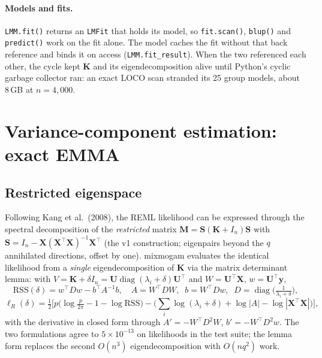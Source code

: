 \documentclass[11pt]{article}
\newcommand{\y}{\mathbf{y}}
\newcommand{\K}{\mathbf{K}}
\newcommand{\Mm}{\mathbf{M}}
\newcommand{\X}{\mathbf{X}}
\newcommand{\U}{\mathbf{U}}
\newcommand{\Sm}{\mathbf{S}}
\begin{document}
\paragraph{Models and fits.} \texttt{LMM.fit()} returns an
\texttt{LMFit} that holds its model, so \texttt{fit.scan()},
\texttt{blup()} and \texttt{predict()} work on the fit alone. The model
caches the fit without that back reference and binds it on access
(\texttt{LMM.fit\_result}). When the two referenced each other, the cycle
kept $\K$ and its eigendecomposition alive until Python's cyclic garbage
collector ran: an exact LOCO scan stranded its 25 group models, about
8\,GB at $n = 4{,}000$.

\section{Variance-component estimation: exact EMMA}
\label{sec:fit}

\subsection{Restricted eigenspace}

Following Kang et al.\ (2008), the REML likelihood can be expressed
through the spectral decomposition of the \emph{restricted} matrix
$\Mm = \Sm(\K + I_n)\Sm$ with $\Sm = I_n - \X(\X^\top\X)^{-1}\X^\top$
(the v1 construction; eigenpairs beyond the $q$ annihilated directions,
offset by one). mixmogam evaluates the identical likelihood from a
\emph{single} eigendecomposition of $\K$ via the matrix determinant
lemma: with $V = \K + \delta I_n = \U \operatorname{diag}(\lambda_i +
\delta) \U^\top$ and $W = \U^\top \X$, $w = \U^\top \y$,
\begin{equation}
  \mathrm{RSS}(\delta) = w^\top D w - b^\top A^{-1} b, \quad
  A = W^\top D W,\;\; b = W^\top D w,\;\; D = \operatorname{diag}\bigl(\tfrac{1}{\lambda_i + \delta}\bigr),
\end{equation}
\begin{equation}
  \ell_R(\delta) = \tfrac12\Big[p\big(\log\tfrac{p}{2\pi} - 1 - \log \mathrm{RSS}\big)
  - \big(\textstyle\sum_i \log(\lambda_i{+}\delta) + \log|A| - \log|\X^\top\X|\big)\Big],
  \label{eq:reml}
\end{equation}
with the derivative in closed form through $A' = -W^\top D^2 W$,
$b' = -W^\top D^2 w$. The two formulations agree to $5 \times 10^{-13}$
on likelihoods in the test suite; the lemma form replaces the second
$O(n^3)$ eigendecomposition with $O(nq^2)$ work.
\end{document}
